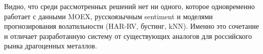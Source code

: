 Видно, что среди рассмотренных решений нет ни одного, которое
одновременно работает с данными MOEX, русскоязычным sentiment
и моделями прогнозирования волатильности (HAR-RV, бустинг, kNN).
Именно это сочетание и отличает разработанную систему от существующих
аналогов для российского рынка драгоценных металлов.
